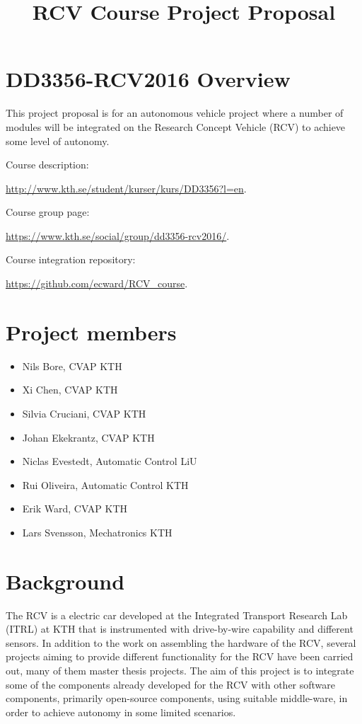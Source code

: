 \documentclass[11pt,a4paper]{article}
\title{RCV Course Project Proposal}
\begin{document}
\maketitle

\section{DD3356-RCV2016 Overview}


This project proposal is for an autonomous vehicle project where a number of modules will be integrated on the Research Concept Vehicle (RCV) to achieve some level of autonomy.

Course description:

\url{http://www.kth.se/student/kurser/kurs/DD3356?l=en}.

Course group page:

\url{https://www.kth.se/social/group/dd3356-rcv2016/}.

Course integration repository:

\url{https://github.com/ecward/RCV_course}.

\section{Project members}

\begin{itemize}
\item Nils Bore, CVAP KTH
\item Xi Chen, CVAP KTH
\item Silvia Cruciani, CVAP KTH
\item Johan Ekekrantz, CVAP KTH
\item Niclas Evestedt, Automatic Control LiU
\item Rui Oliveira, Automatic Control KTH
\item Erik Ward, CVAP KTH
\item Lars Svensson, Mechatronics KTH
\end{itemize}

\section{Background}

The RCV is a electric car developed at the
Integrated Transport Research Lab (ITRL) at KTH that is instrumented
with drive-by-wire capability and different sensors.
In addition to the work on assembling the hardware of the RCV, several
projects aiming to provide different functionality for the RCV have
been carried out, many of them master thesis projects. The aim of this
project is to integrate some of the components already developed for
the RCV with other software components, primarily open-source
components, using suitable middle-ware, in order to achieve
autonomy in some limited scenarios.
\end{document}
